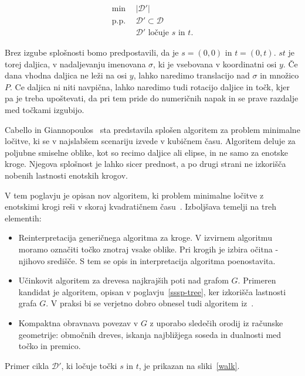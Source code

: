 \documentclass[a4paper, 12pt]{book}
\newcommand{\D}{\ensuremath{\mathcal{D}}}
\begin{document}
\begin{align*}
	\min ~~		& |\D'|\\
	 \mbox{p.p.}~~ & \D'\subset \D\\
				&	\D'\text{ ločuje $s$ in $t$}. 
\end{align*}

Brez izgube splošnosti bomo predpostavili, da je $s=(0,0)$ in $t=(0,t)$. $st$ je torej daljica, v nadaljevanju imenovana $\sigma$, ki je vsebovana v koordinatni osi $y$. Če dana vhodna daljica ne leži na osi $y$, lahko naredimo translacijo nad $\sigma$ in množico $P$. Ce daljica ni niti navpična, lahko naredimo tudi rotacijo daljice in točk, kjer pa je treba upoštevati, da pri tem pride do numeričnih napak in se prave razdalje med točkami izgubijo. 

Cabello in Giannopoulos~\cite{CG16} sta predstavila splošen algoritem za problem minimalne ločitve, ki se v najslabšem scenariju izvede v kubičnem času. Algoritem deluje za poljubne smiselne oblike, kot so recimo daljice ali elipse, in ne samo za enotske kroge. Njegova splošnost je lahko sicer prednost, a po drugi strani ne izkorišča nobenih lastnosti enotskih krogov.

V tem poglavju je opisan nov algoritem, ki problem minimalne ločitve z enotskimi krogi reši v skoraj kvadratičnem času~\cite{CM2}. Izboljšava temelji na treh elementih:
\begin{itemize}
\item Reinterpretacija generičnega algoritma za kroge. V izvirnem algoritmu moramo označiti točko znotraj vsake oblike. Pri krogih je izbira očitna - njihovo središče. S tem se opis in interpretacija algoritma poenostavita.
\item Učinkovit algoritem za drevesa najkrajših poti nad grafom $G$. Primeren kandidat je algoritem, opisan v poglavju~\ref{sssp-tree}, ker izkorišča lastnosti grafa $G$. V praksi bi se verjetno dobro obnesel tudi algoritem iz~\cite{ChanS16}.
\item Kompaktna obravnava povezav v $G$ z uporabo sledečih orodij iz računske geometrije: območnih dreves, iskanja najbližjega soseda in dualnosti med točko in premico. 
\end{itemize}

Primer cikla $\D'$, ki ločuje točki $s$ in $t$, je prikazan na sliki~\ref{walk}.
\end{document}
